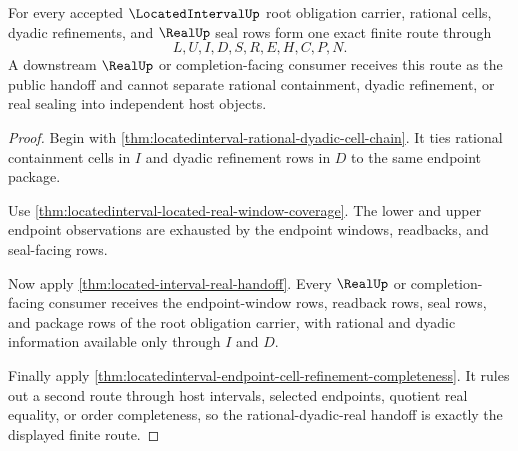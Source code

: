 \begin{theorem}
\label{thm:locatedinterval-rational-dyadic-real-handoff-exactness}
For every accepted $\LocatedIntervalUp$ root obligation carrier, rational cells, dyadic refinements, and $\RealUp$ seal rows form one exact finite route through
$$
L,U,I,D,S,R,E,H,C,P,N.
$$
A downstream $\RealUp$ or completion-facing consumer receives this route as the public handoff and cannot separate rational containment, dyadic refinement, or real sealing into independent host objects.
\end{theorem}
\begin{proof}
Begin with \autoref{thm:locatedinterval-rational-dyadic-cell-chain}. It ties rational containment cells in $I$ and dyadic refinement rows in $D$ to the same endpoint package.

Use \autoref{thm:locatedinterval-located-real-window-coverage}. The lower and upper endpoint observations are exhausted by the endpoint windows, readbacks, and seal-facing rows.

Now apply \autoref{thm:located-interval-real-handoff}. Every $\RealUp$ or completion-facing consumer receives the endpoint-window rows, readback rows, seal rows, and package rows of the root obligation carrier, with rational and dyadic information available only through $I$ and $D$.

Finally apply \autoref{thm:locatedinterval-endpoint-cell-refinement-completeness}. It rules out a second route through host intervals, selected endpoints, quotient real equality, or order completeness, so the rational-dyadic-real handoff is exactly the displayed finite route.
\end{proof}


